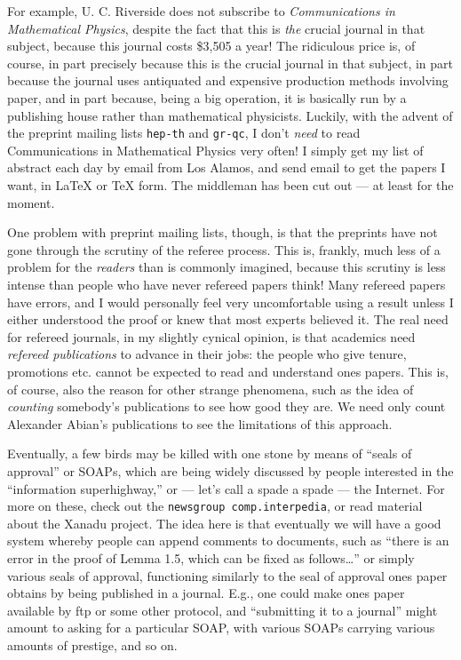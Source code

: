 \documentclass{article}
\begin{document}
For example, U. C. Riverside does not subscribe to \emph{Communications
in Mathematical Physics}, despite the fact that this is \emph{the}
crucial journal in that subject, because this journal costs \$3,505 a
year! The ridiculous price is, of course, in part precisely because this
is the crucial journal in that subject, in part because the journal uses
antiquated and expensive production methods involving paper, and in part
because, being a big operation, it is basically run by a publishing
house rather than mathematical physicists. Luckily, with the advent of
the preprint mailing lists \texttt{hep-th} and \texttt{gr-qc}, I don't
\emph{need} to read Communications in Mathematical Physics very often! I
simply get my list of abstract each day by email from Los Alamos, and
send email to get the papers I want, in LaTeX or TeX form. The middleman
has been cut out --- at least for the moment.

One problem with preprint mailing lists, though, is that the preprints
have not gone through the scrutiny of the referee process. This is,
frankly, much less of a problem for the \emph{readers} than is commonly
imagined, because this scrutiny is less intense than people who have
never refereed papers think! Many refereed papers have errors, and I
would personally feel very uncomfortable using a result unless I either
understood the proof or knew that most experts believed it. The real
need for refereed journals, in my slightly cynical opinion, is that
academics need \emph{refereed publications} to advance in their jobs:
the people who give tenure, promotions etc. cannot be expected to read
and understand ones papers. This is, of course, also the reason for
other strange phenomena, such as the idea of \emph{counting} somebody's
publications to see how good they are. We need only count Alexander
Abian's publications to see the limitations of this approach.

Eventually, a few birds may be killed with one stone by means of ``seals
of approval'' or SOAPs, which are being widely discussed by people
interested in the ``information superhighway,'' or --- let's call a
spade a spade --- the Internet. For more on these, check out the
\texttt{newsgroup\ comp.interpedia}, or read material about the Xanadu
project. The idea here is that eventually we will have a good system
whereby people can append comments to documents, such as ``there is an
error in the proof of Lemma 1.5, which can be fixed as follows\ldots{}''
or simply various seals of approval, functioning similarly to the seal
of approval ones paper obtains by being published in a journal. E.g.,
one could make ones paper available by ftp or some other protocol, and
``submitting it to a journal'' might amount to asking for a particular
SOAP, with various SOAPs carrying various amounts of prestige, and so
on.
\end{document}
